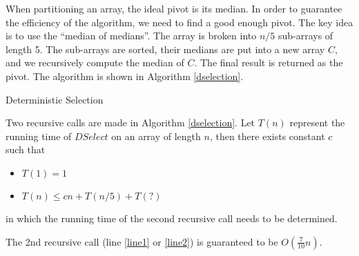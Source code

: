 When partitioning an array, the ideal pivot is its median. In order to guarantee the efficiency of the algorithm, we need to find a good enough pivot. The key idea is to use the ``median of medians''. The array is broken into $n/5$ sub-arrays of length 5. The sub-arrays are sorted, their medians are put into a new array $C$, and we recursively compute the median of $C$. The final result is returned as the pivot. The algorithm is shown in Algorithm \ref{dselection}.
\begin{algorithm}[ht]
\caption{Deterministic Selection}\label{dselection}
\begin{algorithmic}[1]
\Input{}
\Output{}
\EndIf 
{}
\label{line1}
\Else{}\label{line2}
\EndIf
\EndFunction
\end{algorithmic}
\end{algorithm}
Two recursive calls are made in Algorithm \ref{dselection}. Let $T(n)$ represent the running time of $DSelect$ on an array of length $n$, then there exists constant $c$ such that 
\begin{itemize}
\item $T(1)=1$
\item $T(n)\leq cn+T(n/5)+T(?)$
\end{itemize}
in which the running time of the second recursive call needs to be determined. 
\begin{lemma}
The 2nd recursive call (line \ref{line1} or \ref{line2}) is guaranteed to be $O(\frac{7}{10}n)$.
\end{lemma}
